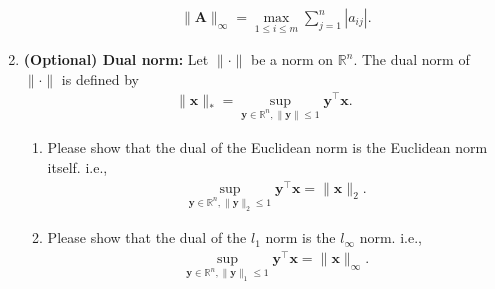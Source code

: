 \documentclass[11pt,letter,notitlepage]{article}
\theoremstyle{definition}
\begin{document}
\begin{exercise}[Norms]
\begin{enumerate}
\begin{enumerate}
			\begin{align*}
				\|\mathbf{A}\|_{\infty} = \max_{1\le i\le m}\sum_{j=1}^n|a_{ij}|.
			\end{align*}
		\end{enumerate}
		\item \textbf{(Optional) Dual norm:} Let $\|\cdot\|$ be a norm on $\mathbb{R}^n$. The dual norm of $\|\cdot\|$ is defined by
		\begin{align*}
			\|\mathbf{x}\|_* = \sup_{\mathbf{y}\in \mathbb{R}^n, \|\mathbf{y}\|\le 1}\mathbf{y}^{\top}\mathbf{x}.
		\end{align*}
		\begin{enumerate}
			\item Please show that the dual of the Euclidean norm is the Euclidean norm itself. i.e., 
			\begin{align*}
				\sup_{\mathbf{y}\in \mathbb{R}^n, \|\mathbf{y}\|_2\le 1}\mathbf{y}^{\top}\mathbf{x} = \|\mathbf{x}\|_2.
			\end{align*}
			\item Please show that the dual of the $l_1$ norm is the $l_{\infty}$ norm. i.e.,
			\begin{align*}
				\sup_{\mathbf{y}\in \mathbb{R}^n, \|\mathbf{y}\|_1\le 1}\mathbf{y}^{\top}\mathbf{x} = \|\mathbf{x}\|_{\infty}.
			\end{align*}
		\end{enumerate}
    \end{enumerate}
\end{exercise}

\newpage
\end{document}
